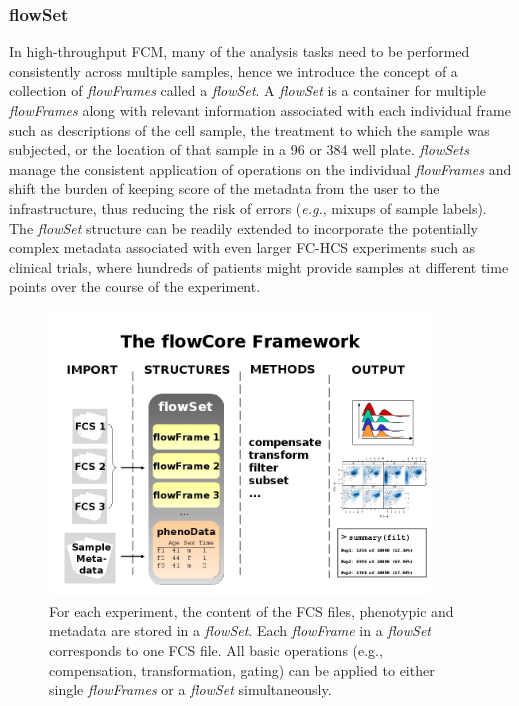 \documentclass[12pt]{article}
\newcommand{\Rclass}[1]{{\textit{#1}}}
\begin{document}
\subsubsection*{flowSet}
In high-throughput FCM, many of the analysis tasks need to be
performed consistently across multiple samples, hence we introduce the
concept of a collection of \Rclass{flowFrames} called a
\Rclass{flowSet}. A \Rclass{flowSet} is a container for multiple
\Rclass{flowFrames} along with relevant information associated with
each individual frame such as descriptions of the cell sample, the
treatment to which the sample was subjected, or the location of that
sample in a 96 or 384 well plate.  \Rclass{flowSets} manage the
consistent application of operations on the individual
\Rclass{flowFrames} and shift the burden of keeping score of the
metadata from the user to the infrastructure, thus reducing the risk
of errors (\textit{e.g.}, mixups of sample labels). The
\Rclass{flowSet} structure can be readily extended to incorporate the
potentially complex metadata associated with even larger FC-HCS
experiments such as clinical trials, where hundreds of patients might
provide samples at different time points over the course of the
experiment.


\begin{figure}
\centering
\includegraphics[width=0.9\textwidth]{Figure1-flowCoreFrameWork.jpg}
\caption{\label{fig1:FrameWork}{For each experiment, the content of
    the FCS files, phenotypic and metadata are stored in a
    \Rclass{flowSet}. Each \Rclass{flowFrame} in a \Rclass{flowSet}
    corresponds to one FCS file. All basic operations (e.g.,
    compensation, transformation, gating) can be applied to either
    single \Rclass{flowFrames} or a \Rclass{flowSet} simultaneously.}}
\end{figure}
\end{document}
